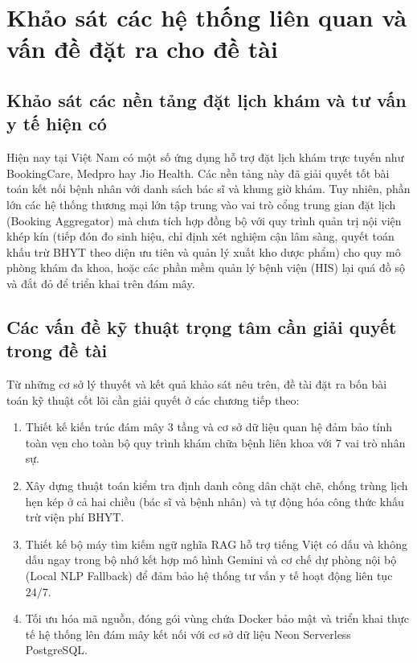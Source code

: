 \section{Khảo sát các hệ thống liên quan và vấn đề đặt ra cho đề tài}

\subsection{Khảo sát các nền tảng đặt lịch khám và tư vấn y tế hiện có}

Hiện nay tại Việt Nam có một số ứng dụng hỗ trợ đặt lịch khám trực tuyến như BookingCare, Medpro hay Jio Health. Các nền tảng này đã giải quyết tốt bài toán kết nối bệnh nhân với danh sách bác sĩ và khung giờ khám. Tuy nhiên, phần lớn các hệ thống thương mại lớn tập trung vào vai trò cổng trung gian đặt lịch (Booking Aggregator) mà chưa tích hợp đồng bộ với quy trình quản trị nội viện khép kín (tiếp đón đo sinh hiệu, chỉ định xét nghiệm cận lâm sàng, quyết toán khấu trừ BHYT theo diện ưu tiên và quản lý xuất kho dược phẩm) cho quy mô phòng khám đa khoa, hoặc các phần mềm quản lý bệnh viện (HIS) lại quá đồ sộ và đắt đỏ để triển khai trên đám mây.

\subsection{Các vấn đề kỹ thuật trọng tâm cần giải quyết trong đề tài}

Từ những cơ sở lý thuyết và kết quả khảo sát nêu trên, đề tài đặt ra bốn bài toán kỹ thuật cốt lõi cần giải quyết ở các chương tiếp theo:
\begin{enumerate}
    \item Thiết kế kiến trúc đám mây 3 tầng và cơ sở dữ liệu quan hệ đảm bảo tính toàn vẹn cho toàn bộ quy trình khám chữa bệnh liên khoa với 7 vai trò nhân sự.
    \item Xây dựng thuật toán kiểm tra định danh công dân chặt chẽ, chống trùng lịch hẹn kép ở cả hai chiều (bác sĩ và bệnh nhân) và tự động hóa công thức khấu trừ viện phí BHYT.
    \item Thiết kế bộ máy tìm kiếm ngữ nghĩa RAG hỗ trợ tiếng Việt có dấu và không dấu ngay trong bộ nhớ kết hợp mô hình Gemini và cơ chế dự phòng nội bộ (Local NLP Fallback) để đảm bảo hệ thống tư vấn y tế hoạt động liên tục $24/7$.
    \item Tối ưu hóa mã nguồn, đóng gói vùng chứa Docker bảo mật và triển khai thực tế hệ thống lên đám mây kết nối với cơ sở dữ liệu Neon Serverless PostgreSQL.
\end{enumerate}
